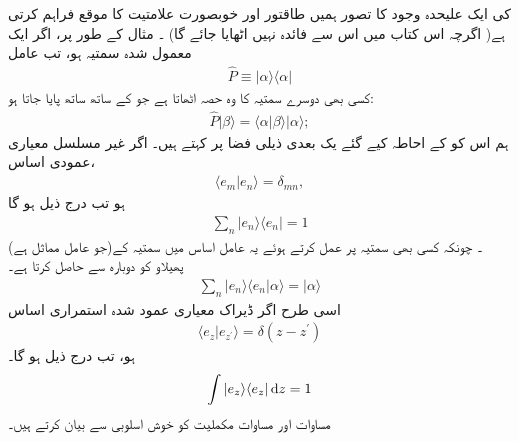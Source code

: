  کی ایک علیحدہ وجود کا تصور ہمیں طاقتور اور خوبصورت علامتیت کا موقع فراہم کرتی ہے( اگرچہ اس کتاب میں اس  سے فائدہ نہیں اٹھایا جائے گا) ۔ مثال کے طور پر، اگر   ایک معمول   شدہ  سمتیہ ہو،  تب عامل 
\begin{align}
\hat{P} \equiv | \alpha \rangle \langle \alpha | 
\end{align}
کسی بھی  دوسرے سمتیہ کا وہ حصہ اٹھاتا ہے  جو    کے ساتھ ساتھ پایا جاتا ہو:
\begin{align*}
\hat{P} | \beta \rangle = \langle \alpha | \beta \rangle | \alpha \rangle ;
\end{align*}
ہم اس کو    کے  احاطہ کیے گئے یک بعدی ذیلی فضا پر   کہتے ہیں۔  اگر  غیر مسلسل معیاری عمودی اساس،
\begin{align}
\langle e_{m} | e_{n} \rangle = \delta_{mn},
\end{align}
ہو تب درج ذیل ہو گا 
\begin{align}\label{مساوات_قواعد_مکملیت_الف}
\sum_{n} | e_{n} \rangle \langle e_{n} | = 1 
\end{align}
(جو عامل مماثل ہے)۔ چونکہ کسی بھی سمتیہ  پر عمل کرتے ہوئے یہ عامل اساس  میں سمتیہ  کے پھیلاو  کو      دوبارہ  سے حاصل کرتا ہے۔ 
\begin{align}
\sum_{n} | e_{n} \rangle \langle e_{n} | \alpha \rangle = | \alpha \rangle 
\end{align}
اسی طرح اگر    ڈیراک معیاری عمود  شدہ استمراری اساس  
\begin{align}
\langle e_{z} | e_{z^{'}} \rangle = \delta ( z-z^{'})
\end{align}
ہو، تب درج ذیل ہو گا۔ 
\begin{align}\label{مساوات_قواعد_مکملیت_ب}
\int | e_{z} \rangle \langle e_{z} | \dif z = 1
\end{align}
 مساوات    اور مساوات   مکملیت   کو  خوش اسلوبی سے  بیان کرتے ہیں۔
 
